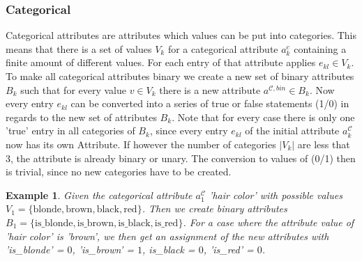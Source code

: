 \documentclass[a4paper,preprint]{sig-alternate-xt}
\newtheorem{exmp}{Example}[section]
\begin{document}
\subsubsection{Categorical}
Categorical attributes are attributes which values can be put into categories.
This means that there is a set of values $V_{k}$ for a categorical attribute $a^c_k$ containing a finite amount of different values.
For each entry of that attribute applies $e_{kl} \in V_{k}$.
To make all categorical attributes binary we create a new set of binary attributes $B_{k}$ such that for every value $v \in V_{k}$ there is a new attribute $a^{\mathcal{C},bin} \in B_{k}$.
Now every entry $e_{kl}$ can be converted into a series of true or false statements (1/0) in regards to the new set of attributes $B_k$.
Note that for every case there is only one 'true' entry in all categories of $B_k$, since every entry $e_{kl}$ of the initial attribute $a^\mathcal{C}_k$ now has its own Attribute.
If however the number of categories $|V_k|$ are less that 3, the attribute is already binary or unary.
The conversion to values of (0/1) then is trivial, since no new categories have to be created.

\begin{exmp}
Given the categorical attribute $a^\mathcal{C}_1$ 'hair color' with possible values $V_{1} = \{\text{blonde},\text{brown},\text{black},\text{red}\}$.
Then we create binary attributes $B_{1} = \{\text{is\_blonde},\text{is\_brown},\text{is\_black},\text{is\_red}\}$.
For a case where the attribute value of 'hair color' is 'brown', we then get an assignment of the new attributes with 'is\_blonde' = $0$, 'is\_brown' = $1$, is\_black = $0$, 'is\_red' = $0$.
\end{exmp}
\end{document}
